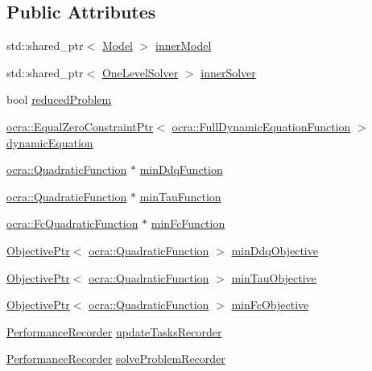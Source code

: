 \subsection*{Public Attributes}
\begin{DoxyCompactItemize}
\item 
std\+::shared\+\_\+ptr$<$ \hyperlink{classocra_1_1Model}{Model} $>$ \hyperlink{structwocra_1_1WocraController_1_1Pimpl_a4fe5b4fd5e927bbf9c83bf10ffafc98f}{inner\+Model}
\item 
std\+::shared\+\_\+ptr$<$ \hyperlink{classocra_1_1OneLevelSolver}{One\+Level\+Solver} $>$ \hyperlink{structwocra_1_1WocraController_1_1Pimpl_a761307f74ee3b130993d589372164b98}{inner\+Solver}
\item 
bool \hyperlink{structwocra_1_1WocraController_1_1Pimpl_a809b85a6059fda8abddf709a92224443}{reduced\+Problem}
\item 
\hyperlink{classocra_1_1EqualZeroConstraintPtr}{ocra\+::\+Equal\+Zero\+Constraint\+Ptr}$<$ \hyperlink{classocra_1_1FullDynamicEquationFunction}{ocra\+::\+Full\+Dynamic\+Equation\+Function} $>$ \hyperlink{structwocra_1_1WocraController_1_1Pimpl_a1109652d5d4a11542cc5130713977b73}{dynamic\+Equation}
\item 
\hyperlink{classocra_1_1QuadraticFunction}{ocra\+::\+Quadratic\+Function} $\ast$ \hyperlink{structwocra_1_1WocraController_1_1Pimpl_aac1952b2ca7547f82d807089baa98f10}{min\+Ddq\+Function}
\item 
\hyperlink{classocra_1_1QuadraticFunction}{ocra\+::\+Quadratic\+Function} $\ast$ \hyperlink{structwocra_1_1WocraController_1_1Pimpl_a49e2adcc51cd75b3a17ebf31cf497d31}{min\+Tau\+Function}
\item 
\hyperlink{classocra_1_1FcQuadraticFunction}{ocra\+::\+Fc\+Quadratic\+Function} $\ast$ \hyperlink{structwocra_1_1WocraController_1_1Pimpl_af1d4d6700f771ae7c2bf129b7cb1fd06}{min\+Fc\+Function}
\item 
\hyperlink{classocra_1_1ObjectivePtr}{Objective\+Ptr}$<$ \hyperlink{classocra_1_1QuadraticFunction}{ocra\+::\+Quadratic\+Function} $>$ \hyperlink{structwocra_1_1WocraController_1_1Pimpl_a7fc80a10628bf0361a7c44d5bb659742}{min\+Ddq\+Objective}
\item 
\hyperlink{classocra_1_1ObjectivePtr}{Objective\+Ptr}$<$ \hyperlink{classocra_1_1QuadraticFunction}{ocra\+::\+Quadratic\+Function} $>$ \hyperlink{structwocra_1_1WocraController_1_1Pimpl_a02fbd15274314a18d7518ad0bb721358}{min\+Tau\+Objective}
\item 
\hyperlink{classocra_1_1ObjectivePtr}{Objective\+Ptr}$<$ \hyperlink{classocra_1_1QuadraticFunction}{ocra\+::\+Quadratic\+Function} $>$ \hyperlink{structwocra_1_1WocraController_1_1Pimpl_a204f0258bde95ab0f29d1d1937cd80d2}{min\+Fc\+Objective}
\item 
\hyperlink{classwocra_1_1PerformanceRecorder}{Performance\+Recorder} \hyperlink{structwocra_1_1WocraController_1_1Pimpl_a91e262e3ecf52354aefa49e76b9e0eb9}{update\+Tasks\+Recorder}
\item 
\hyperlink{classwocra_1_1PerformanceRecorder}{Performance\+Recorder} \hyperlink{structwocra_1_1WocraController_1_1Pimpl_a446e043430909aacb7955ff847c3a311}{solve\+Problem\+Recorder}
\end{DoxyCompactItemize}


